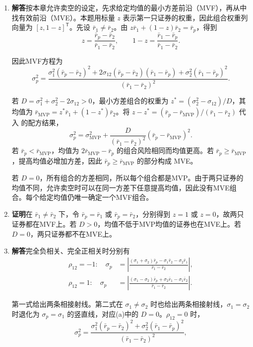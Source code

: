 \begin{solution}[blank-type=manual,blank-vsep=7\baselineskip]
\begin{enumerate}[label=(\alph*)]
\item \textbf{解答}\quad 按本章允许卖空的设定，先求给定均值的最小方差前沿（MVF），再从中找有效前沿（MVE）。本题用标量 $z$ 表示第一只证券的权重，因此组合权重列向量为 $[z,1-z]^{\mathsf T}$。先设 $\bar r_1\ne\bar r_2$。由 $z\bar r_1+(1-z)\bar r_2=\bar r_p$，得到
\[
 z=\frac{\bar r_p-\bar r_2}{\bar r_1-\bar r_2},\qquad1-z=\frac{\bar r_1-\bar r_p}{\bar r_1-\bar r_2}.
\]

因此MVF方程为
\[
 \sigma_p^2=
 \frac{\sigma_1^2(\bar r_p-\bar r_2)^2
 +2\sigma_{12}(\bar r_p-\bar r_2)(\bar r_1-\bar r_p)
 +\sigma_2^2(\bar r_1-\bar r_p)^2}{(\bar r_1-\bar r_2)^2}.
\]

若 $D=\sigma_1^2+\sigma_2^2-2\sigma_{12}>0$，最小方差组合的权重为 $z^*=(\sigma_2^2-\sigma_{12})/D$，其均值为 $\bar r_{\mathrm{MVP}}=z^*\bar r_1+(1-z^*)\bar r_2$。将 $z-z^*=(\bar r_p-\bar r_{\mathrm{MVP}})/(\bar r_1-\bar r_2)$ 代入 的配方结果，
\[
 \sigma_p^2=\sigma_{\mathrm{MVP}}^2+
 \frac{D}{(\bar r_1-\bar r_2)^2}(\bar r_p-\bar r_{\mathrm{MVP}})^2.
\]
若 $\bar r_p<\bar r_{\mathrm{MVP}}$，均值为 $2\bar r_{\mathrm{MVP}}-\bar r_p$ 的组合风险相同而均值更高。若 $\bar r_p\ge \bar r_{\mathrm{MVP}}$，提高均值必增加方差，因此 $\bar r_p\ge \bar r_{\mathrm{MVP}}$ 的部分构成 MVE。

若 $D=0$，所有组合的方差相同，所以每个组合都是MVP。由于两只证券的均值不同，允许卖空时可以在同一方差下任意提高均值，因此没有MVE组合。每个给定均值仍唯一确定一个MVF组合。

\item \textbf{证明}\quad 在 $\bar r_1\ne\bar r_2$ 下，令 $\bar r_p=\bar r_1$ 或 $\bar r_p=\bar r_2$，分别得到 $z=1$ 或 $z=0$，故两只证券都在MVF上。若 $D>0$，均值不低于MVP均值的证券也在MVE上。若 $D=0$，两只证券都不在MVE上。

\item \textbf{解答}\quad 完全负相关、完全正相关时分别有
\[
 \begin{aligned}
 \rho_{12}=-1:\quad\sigma_p
 &=\left|\frac{(\sigma_1+\sigma_2)\bar r_p-\sigma_1\bar r_2-\sigma_2\bar r_1}
 {\bar r_1-\bar r_2}\right|,\\
 \rho_{12}=1:\quad\sigma_p
 &=\left|\frac{(\sigma_1-\sigma_2)\bar r_p+\sigma_2\bar r_1-\sigma_1\bar r_2}
 {\bar r_1-\bar r_2}\right|.
 \end{aligned}
\]

第一式给出两条相接射线。第二式在 $\sigma_1\ne\sigma_2$ 时也给出两条相接射线，$\sigma_1=\sigma_2$ 时退化为 $\sigma_p=\sigma_1$ 的竖直线，对应(a)中的 $D=0$。$\rho_{12}=0$ 时，
\[
 \sigma_p^2=\frac{\sigma_1^2(\bar r_p-\bar r_2)^2+\sigma_2^2(\bar r_1-\bar r_p)^2}
 {(\bar r_1-\bar r_2)^2},
\]


\end{enumerate}
\end{solution}
